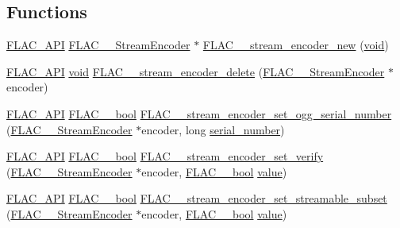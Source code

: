 \subsection*{Functions}
\begin{DoxyCompactItemize}
\item 
\hyperlink{group__flac__export_ga56ca07df8a23310707732b1c0007d6f5}{F\+L\+A\+C\+\_\+\+A\+PI} \hyperlink{struct_f_l_a_c_____stream_encoder}{F\+L\+A\+C\+\_\+\+\_\+\+Stream\+Encoder} $\ast$ \hyperlink{group__flac__stream__encoder_ga35f3d94452bcf0a90a31c7d770b200bc}{F\+L\+A\+C\+\_\+\+\_\+stream\+\_\+encoder\+\_\+new} (\hyperlink{sound_8c_ae35f5844602719cf66324f4de2a658b3}{void})
\item 
\hyperlink{group__flac__export_ga56ca07df8a23310707732b1c0007d6f5}{F\+L\+A\+C\+\_\+\+A\+PI} \hyperlink{sound_8c_ae35f5844602719cf66324f4de2a658b3}{void} \hyperlink{group__flac__stream__encoder_ga9c9956af42bebe923da59437628aa9ea}{F\+L\+A\+C\+\_\+\+\_\+stream\+\_\+encoder\+\_\+delete} (\hyperlink{struct_f_l_a_c_____stream_encoder}{F\+L\+A\+C\+\_\+\+\_\+\+Stream\+Encoder} $\ast$encoder)
\item 
\hyperlink{group__flac__export_ga56ca07df8a23310707732b1c0007d6f5}{F\+L\+A\+C\+\_\+\+A\+PI} \hyperlink{ordinals_8h_a95103469f1cbd78b8cf250194985b34e}{F\+L\+A\+C\+\_\+\+\_\+bool} \hyperlink{group__flac__stream__encoder_ga646c9800d42620a6c504fbdfbd092666}{F\+L\+A\+C\+\_\+\+\_\+stream\+\_\+encoder\+\_\+set\+\_\+ogg\+\_\+serial\+\_\+number} (\hyperlink{struct_f_l_a_c_____stream_encoder}{F\+L\+A\+C\+\_\+\+\_\+\+Stream\+Encoder} $\ast$encoder, long \hyperlink{src_2flac_2main_8c_ad4fa58c4df2ce0ee8892547f07ac9bc9}{serial\+\_\+number})
\item 
\hyperlink{group__flac__export_ga56ca07df8a23310707732b1c0007d6f5}{F\+L\+A\+C\+\_\+\+A\+PI} \hyperlink{ordinals_8h_a95103469f1cbd78b8cf250194985b34e}{F\+L\+A\+C\+\_\+\+\_\+bool} \hyperlink{group__flac__stream__encoder_ga5f4ac18a7207d2864fed72d284486f9e}{F\+L\+A\+C\+\_\+\+\_\+stream\+\_\+encoder\+\_\+set\+\_\+verify} (\hyperlink{struct_f_l_a_c_____stream_encoder}{F\+L\+A\+C\+\_\+\+\_\+\+Stream\+Encoder} $\ast$encoder, \hyperlink{ordinals_8h_a95103469f1cbd78b8cf250194985b34e}{F\+L\+A\+C\+\_\+\+\_\+bool} \hyperlink{lib_2expat_8h_a4a30a13b813682e68c5b689b45c65971}{value})
\item 
\hyperlink{group__flac__export_ga56ca07df8a23310707732b1c0007d6f5}{F\+L\+A\+C\+\_\+\+A\+PI} \hyperlink{ordinals_8h_a95103469f1cbd78b8cf250194985b34e}{F\+L\+A\+C\+\_\+\+\_\+bool} \hyperlink{group__flac__stream__encoder_ga163f1acfe8b6b8ae849f0f4f7c0708f4}{F\+L\+A\+C\+\_\+\+\_\+stream\+\_\+encoder\+\_\+set\+\_\+streamable\+\_\+subset} (\hyperlink{struct_f_l_a_c_____stream_encoder}{F\+L\+A\+C\+\_\+\+\_\+\+Stream\+Encoder} $\ast$encoder, \hyperlink{ordinals_8h_a95103469f1cbd78b8cf250194985b34e}{F\+L\+A\+C\+\_\+\+\_\+bool} \hyperlink{lib_2expat_8h_a4a30a13b813682e68c5b689b45c65971}{value})

\end{DoxyCompactItemize}
